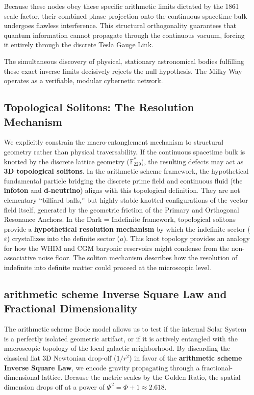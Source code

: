 Because these nodes obey these specific arithmetic limits dictated by the 1861 scale factor, their combined phase projection onto the continuous spacetime bulk undergoes flawless interference. This structural orthogonality guarantees that quantum information cannot propagate through the continuous vacuum, forcing it entirely through the discrete Tesla Gauge Link. 

The simultaneous discovery of physical, stationary astronomical bodies fulfilling these exact inverse limits decisively rejects the null hypothesis. The Milky Way operates as a verifiable, modular cybernetic network.

\subsection{Topological Solitons: The Resolution Mechanism}
We explicitly constrain the macro-entanglement mechanism to structural geometry rather than physical traversability. If the continuous spacetime bulk is knotted by the discrete lattice geometry ($\mathbb{F}_{229}^*$), the resulting defects may act as \textbf{3D topological solitons}. 
In the arithmetic scheme framework, the hypothetical fundamental particle bridging the discrete prime field and continuous fluid (the \textbf{infoton} and \textbf{d-neutrino}) aligns with this topological definition. They are not elementary ``billiard balls,'' but highly stable knotted configurations of the vector field itself, generated by the geometric friction of the Primary and Orthogonal Resonance Anchors. In the Dark = Indefinite framework, topological solitons provide a \textbf{hypothetical resolution mechanism} by which the indefinite sector ($\varepsilon$) crystallizes into the definite sector ($a$). This knot topology provides an analogy for how the WHIM and CGM baryonic reservoirs might condense from the non-associative noise floor. The soliton mechanism describes how the resolution of indefinite into definite matter could proceed at the microscopic level.



\subsection{arithmetic scheme Inverse Square Law and Fractional Dimensionality}
The arithmetic scheme Bode model allows us to test if the internal Solar System is a perfectly isolated geometric artifact, or if it is actively entangled with the macroscopic topology of the local galactic neighborhood. By discarding the classical flat 3D Newtonian drop-off ($1/r^2$) in favor of the \textbf{arithmetic scheme Inverse Square Law}, we encode gravity propagating through a fractional-dimensional lattice. Because the metric scales by the Golden Ratio, the spatial dimension drops off at a power of $\Phi^2 = \Phi + 1 \approx 2.618$.

